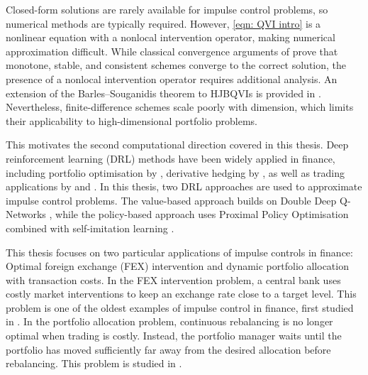 Closed-form solutions are rarely available for impulse control problems, so numerical methods are typically required. However, \eqref{eqn: QVI intro} is a nonlinear equation with a nonlocal intervention operator, making numerical approximation difficult. While classical convergence arguments of \textcite{barlessouganidis1991convergence} prove that monotone, stable, and consistent schemes converge to the correct solution, the presence of a nonlocal intervention operator requires additional analysis. An extension of the Barles--Souganidis theorem to HJBQVIs is provided in \cite{azimzadeh2018impulsecontrolfinancenumerical,azimzadeh2018convergence,azimzadeh2016weakly}. Nevertheless, finite-difference schemes scale poorly with dimension, which limits their applicability to high-dimensional portfolio problems.

This motivates the second computational direction covered in this thesis. Deep reinforcement learning (DRL) methods have been widely applied in finance, including portfolio optimisation by \textcite{JXL17}, derivative hedging by \textcite{buehler2019deep, buehler2022deep}, as well as trading applications by \textcite{jain2025impulse} and \textcite{anchuri2026rammstein}. In this thesis, two DRL approaches are used to approximate impulse control problems. The value-based approach builds on Double Deep Q-Networks \cite{hasselt2010double, van2016deep}, while the policy-based approach uses Proximal Policy Optimisation \cite{schulman2017proximal} combined with self-imitation learning \cite{oh2018self}.

This thesis focuses on two particular applications of impulse controls in finance: Optimal foreign exchange (FEX) intervention and dynamic portfolio allocation with transaction costs. In the FEX intervention problem, a central bank uses costly market interventions to keep an exchange rate close to a target level. This problem is one of the oldest examples of impulse control in finance, first studied in \cite{mundaca1998optimal, cadenillas1999optimal, cadenillas2000classical}. In the portfolio allocation problem, continuous rebalancing is no longer optimal when trading is costly. Instead, the portfolio manager waits until the portfolio has moved sufficiently far away from the desired allocation before rebalancing. This problem is studied in \cite{EH88, MP95, K98}. 

